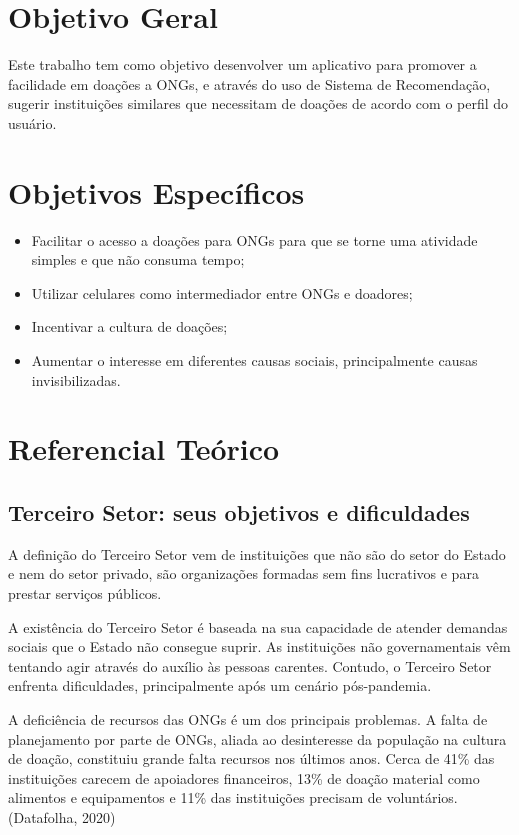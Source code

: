\documentclass[conference]{IEEEtran}
\begin{document}
\section{Objetivo Geral}
Este trabalho tem como objetivo desenvolver um aplicativo para promover a facilidade em doações a ONGs, e através do uso de Sistema de Recomendação, sugerir instituições similares que necessitam de doações de acordo com o perfil do usuário.


\section{Objetivos Específicos}
\begin{itemize}
\item Facilitar o acesso a doações para ONGs para que se torne uma atividade simples e que não consuma tempo;
\item Utilizar celulares como intermediador entre ONGs e doadores;
\item Incentivar a cultura de doações;
\item Aumentar o interesse em diferentes causas sociais, principalmente causas invisibilizadas.
\end{itemize}



\section{Referencial Teórico}
\subsection{Terceiro Setor: seus objetivos e dificuldades}
A definição do Terceiro Setor vem de instituições que não são do setor do Estado e nem do setor privado, são organizações formadas sem fins lucrativos e para prestar serviços públicos. \cite{sitepolitize02} 

A existência do Terceiro Setor é baseada na sua capacidade de atender demandas sociais que o Estado não consegue suprir. As instituições não governamentais vêm tentando agir através do auxílio às pessoas carentes. Contudo, o Terceiro Setor enfrenta dificuldades, principalmente após um cenário pós-pandemia. \cite{silva2020dificuldades}

A deficiência de recursos das ONGs é um dos principais problemas. A falta de planejamento por parte de ONGs, aliada ao desinteresse da população na cultura de doação, constituiu grande falta recursos nos últimos anos. Cerca de 41\% das instituições carecem de apoiadores financeiros, 13\% de doação material como alimentos e equipamentos e 11\% das instituições precisam de voluntários. (Datafolha, 2020)
\end{document}

